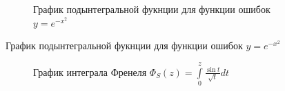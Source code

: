 \documentclass{article}
\begin{document}
\begin{figure}[H]
\begin{minipage}[t]{.4\textwidth}
\begin{figure}[H]
  \caption{График подынтегральной фукнции для функции ошибок $y =  e^{-x^2}$}
  \label{fig:err_fun}
    \end{figure}
\end{minipage}
\end{figure}

\begin{figure}[H]
\centering
\begin{minipage}[t]{.4\textwidth}
\begin{figure}[H]
  \centering
  \caption{График интеграла Френеля $\Phi_{S}(z) = \int\limits_0^{z} \frac{\sin{t}}{\sqrt{t}} dt$}
  \label{fig:fren1_int}
  \end{figure}%
\end{minipage}\hspace{10pt}%
\begin{minipage}[t]{.4\textwidth}%
\begin{figure}[H]
  \centering

\end{figure}
\end{minipage}
\end{figure}
\end{document}
